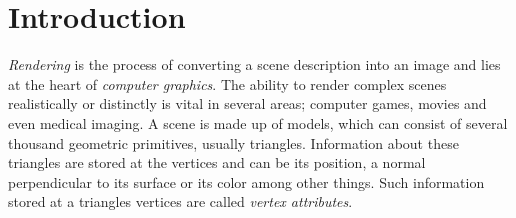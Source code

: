 


\chapter{Introduction}




\textit{Rendering} is the process of converting a scene description into an
image and lies at the heart of \textit{computer graphics}. The ability to render
complex scenes realistically or distinctly is vital in several areas; computer
games, movies and even medical imaging. A scene is made up of models, which can
consist of several thousand geometric primitives, usually triangles. Information
about these triangles are stored at the vertices and can be its position, a
normal perpendicular to its surface or its color among other things. Such
information stored at a triangles vertices are called \textit{vertex
  attributes}.



